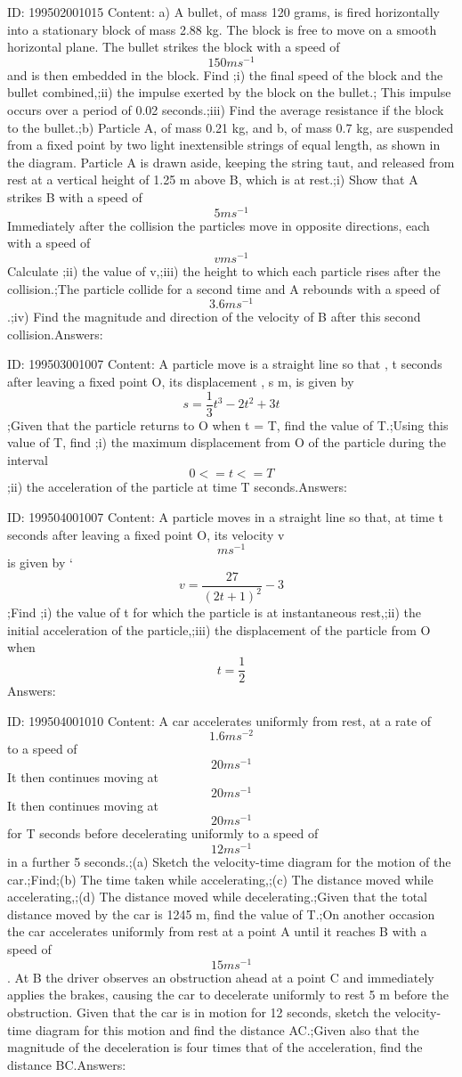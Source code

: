 \documentclass{article}
\begin{document}
ID: 199502001015
Content:
a) A bullet, of mass 120 grams, is fired horizontally into a stationary block of mass 2.88 kg. The block is free to move on a smooth horizontal plane. The bullet strikes the block with a speed of \[150ms^{-1} \] and is then embedded in the block. Find ;i) the final speed of the block and the bullet combined,;ii) the impulse exerted by the block on the bullet.;    This impulse occurs over a period of 0.02 seconds.;iii) Find the average resistance if the block to the bullet.;b) Particle A, of mass 0.21 kg, and b, of mass 0.7 kg, are suspended from a fixed point by two light inextensible strings of equal length, as shown in the diagram. Particle A is drawn aside, keeping the string taut, and released from rest at a vertical height of 1.25 m above B, which is at rest.;i) Show that A strikes B with a speed of \[5ms^{-1} \] Immediately after the collision the particles move in opposite directions, each with a speed of \[vms^{-1} \] Calculate  ;ii) the value of v,;iii) the height to which each particle rises after the collision.;The particle collide for a second time and A rebounds with a speed of \[3.6ms^{-1} \].;iv) Find the magnitude and direction of the velocity of B after this second collision.Answers:

ID: 199503001007
Content:
A particle move is a straight line so that , t seconds after leaving a fixed point O, its displacement , s m, is given by \[s=\frac{1}{3}t^3-2t^2+3t\];Given that the particle returns to O when t = T, find the value of T.;Using this value of T, find ;i) the maximum displacement from O of the particle during the interval \[0<=t<=T\] ;ii) the acceleration of the particle at time T seconds.Answers:

ID: 199504001007
Content:
A particle moves in a straight line so that, at time t seconds after leaving a fixed point O, its velocity v \[ms^{-1}\] is given by `\[v=\frac{27}{(2t+1)^2}-3\];Find ;i) the value of t for which the particle is at instantaneous rest,;ii) the initial acceleration of the particle,;iii) the displacement of the particle from O when \[t=\frac{1}{2}\]Answers:

ID: 199504001010
Content:
A car accelerates uniformly from rest, at a rate of \[1.6ms^{-2}\] to a speed of \[20ms^{-1}\] It then continues moving at \[20ms^{-1}\]  It then continues moving at \[20ms^{-1}\] for T seconds before decelerating uniformly to a speed of \[12ms^{-1}\] in a further 5 seconds.;(a)	Sketch the velocity-time diagram for the motion of the car.;Find;(b)	The time taken while accelerating,;(c)	The distance moved while accelerating,;(d)	The distance moved while decelerating.;Given that the total distance moved by the car is 1245 m, find the value of T.;On another occasion the car accelerates uniformly from rest at a point A until it reaches B with a speed of \[15ms^{-1}\]. At B the driver observes an obstruction ahead at a point C and immediately applies the brakes, causing the car to decelerate uniformly to rest 5 m before the obstruction. Given that the car is in motion for 12 seconds, sketch the velocity-time diagram for this motion and find the distance AC.;Given also that the magnitude of the deceleration is four times that of the acceleration, find the distance BC.Answers:
\end{document}
